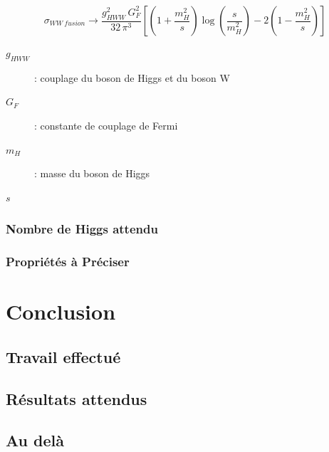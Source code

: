 \documentclass[10pt,a4paper]{report}
\begin{document}
\begin{equation}
	\sigma_{WW\ fusion} \longrightarrow 
		\frac{g_{HWW}^2 \, G_F^2}{32 \, \pi^3}
		\left[
			\left(1 + \frac{m_H^2}{s}\right) \log\left(\frac{s}{m_H^2}\right)
			- 2 \left(1 - \frac{m_H^2}{s}\right)
		\right]
\end{equation}

\begin{description}

	\item[$g_{HWW}$] : couplage du boson de Higgs et du boson W

	\item[$G_F$] : constante de couplage de Fermi
	
	\item[$m_H$] : masse du boson de Higgs
	
	\item[$s$]
		
\end{description}

\subsection{Nombre de Higgs attendu}

\subsection{Propriétés à Préciser}

\chapter{Conclusion}

\section{Travail effectué}

\section{Résultats attendus}

\section{Au delà}

\end{document}

